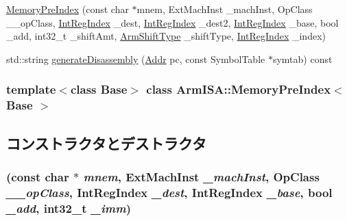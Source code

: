 \begin{DoxyCompactItemize}
\item 
\hyperlink{classArmISA_1_1MemoryPreIndex_aae533a646860c37910df38f801de1462}{MemoryPreIndex} (const char $\ast$mnem, ExtMachInst \_\-machInst, OpClass \_\-\_\-opClass, \hyperlink{namespaceArmISA_ae64680ba9fb526106829d6bf92fc791b}{IntRegIndex} \_\-dest, \hyperlink{namespaceArmISA_ae64680ba9fb526106829d6bf92fc791b}{IntRegIndex} \_\-dest2, \hyperlink{namespaceArmISA_ae64680ba9fb526106829d6bf92fc791b}{IntRegIndex} \_\-base, bool \_\-add, int32\_\-t \_\-shiftAmt, \hyperlink{namespaceArmISA_a209d79feaaef0aa2f54ae62e53ee90de}{ArmShiftType} \_\-shiftType, \hyperlink{namespaceArmISA_ae64680ba9fb526106829d6bf92fc791b}{IntRegIndex} \_\-index)
\item 
std::string \hyperlink{classArmISA_1_1MemoryPreIndex_a95d323a22a5f07e14d6b4c9385a91896}{generateDisassembly} (\hyperlink{classm5_1_1params_1_1Addr}{Addr} pc, const SymbolTable $\ast$symtab) const 
\end{DoxyCompactItemize}
\subsubsection*{template$<$class Base$>$ class ArmISA::MemoryPreIndex$<$ Base $>$}



\subsection{コンストラクタとデストラクタ}
\hypertarget{classArmISA_1_1MemoryPreIndex_a58ad09833612aa6c13a629c4dec47f7a}{
\subsubsection[{MemoryPreIndex}]{ (const char $\ast$ {\em mnem}, \/  ExtMachInst {\em \_\-machInst}, \/  OpClass {\em \_\-\_\-opClass}, \/  {\bf IntRegIndex} {\em \_\-dest}, \/  {\bf IntRegIndex} {\em \_\-base}, \/  bool {\em \_\-add}, \/  int32\_\-t {\em \_\-imm})}}
\label{classArmISA_1_1MemoryPreIndex_a58ad09833612aa6c13a629c4dec47f7a}



